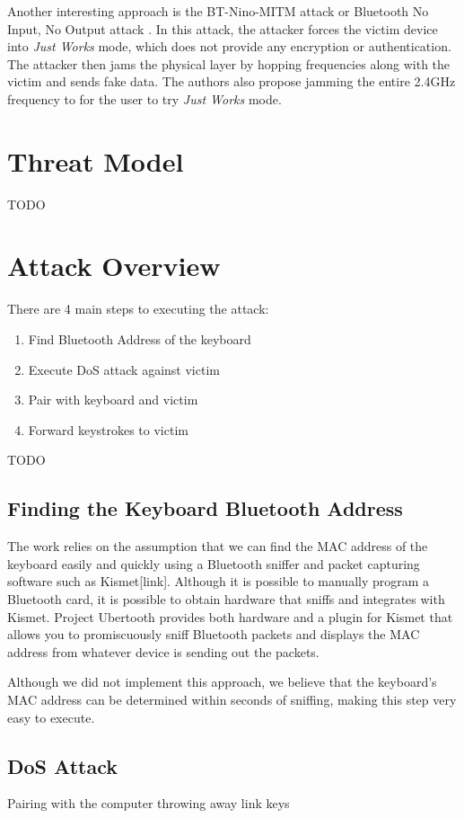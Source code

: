 \documentclass{acm_proc_article-sp}
\begin{document}
Another interesting approach is the BT-Nino-MITM attack or Bluetooth No Input, No Output attack \cite{4401672}
. In this attack, the attacker forces the victim device into \textit{Just Works} mode, which does not provide any encryption or authentication. The attacker then jams the physical layer by hopping frequencies along with the victim and sends fake data. The authors also propose jamming the entire 2.4GHz frequency to for the user to try \textit{Just Works} mode. 

\section{Threat Model}
TODO

\section{Attack Overview}
There are 4 main steps to executing the attack:
\begin{enumerate}
\item Find Bluetooth Address of the keyboard
\item Execute DoS attack against victim
\item Pair with keyboard and victim
\item Forward keystrokes to victim
\end{enumerate}
TODO 
\subsection{Finding the Keyboard Bluetooth Address}
The work relies on the assumption that we can find the MAC address of the keyboard easily and quickly using a Bluetooth sniffer and packet capturing software such as Kismet[link]. Although it is possible to manually program a Bluetooth card, it is possible to obtain hardware that sniffs and integrates with Kismet. Project Ubertooth provides both hardware and a plugin for Kismet that allows you to promiscuously sniff Bluetooth packets and displays the MAC address from whatever device is sending out the packets. 

Although we did not implement this approach, we believe that the keyboard's MAC address can be determined within seconds of sniffing, making this step very easy to execute. 
\cite{hak5}

\subsection{DoS Attack}
Pairing with the computer
throwing away link keys 
\end{document}
